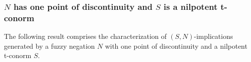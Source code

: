 \begin{example}
\end{example}

\subsubsection{$N$ has one point of discontinuity and $S$ is a nilpotent t-conorm}

The following result comprises the characterization of $(S,N)$-implications generated by a fuzzy negation $N$ with one point of discontinuity and a nilpotent t-conorm $S$.

